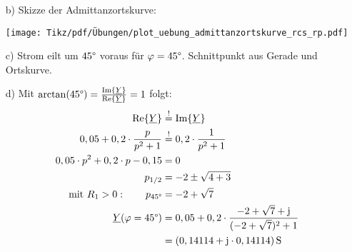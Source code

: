 {\begin{minipage}{0.4\textwidth}
\begin{itemize}
\item[b)] Skizze der Admittanzortskurve:
\item[] \texttt{[image: Tikz/pdf/Übungen/plot\_uebung\_admittanzortskurve\_rcs\_rp.pdf]}
\item[c)] Strom eilt um $45\degree$ voraus für $\varphi=45\degree$.
    Schnittpunkt aus Gerade und Ortskurve.
\end{itemize}
\end{minipage}%
\begin{minipage}{0.6\textwidth}
\begin{itemize}
    \item[d)] Mit $\arctan(45\degree)=\frac{\operatorname{Im}\{\underline{Y}\}}{\operatorname{Re}\{\underline{Y}\}} = 1$ folgt:
    \begin{align*}
        \operatorname{Re}\{\underline{Y}\} &\overset{!}{=} \operatorname{Im}\{\underline{Y}\} \\
        0,05 + 0,2 \cdot \frac{p}{p^2+1} &\overset{!}{=} 0,2 \cdot \frac{1}{p^2+1}\\ 
        0,05 \cdot p^2 + 0,2 \cdot p - 0,15 &= 0 \\
        p_{1/2} &= -2 \pm \sqrt{4 + 3} \\
        \text{mit }R_1>0: \qquad p_{45\degree} &= -2 + \sqrt{7} \\
        \underline{Y}(\varphi=45\degree) &= 0,05 + 0,2 \cdot \frac{-2 + \sqrt{7} + \mathrm{j}}{(-2 + \sqrt{7})^2 + 1} \\
        &= (0,14114 + \mathrm{j} \cdot 0,14114)\,\mathrm{S}
    \end{align*}
\end{itemize}
\end{minipage}\hfill
}


